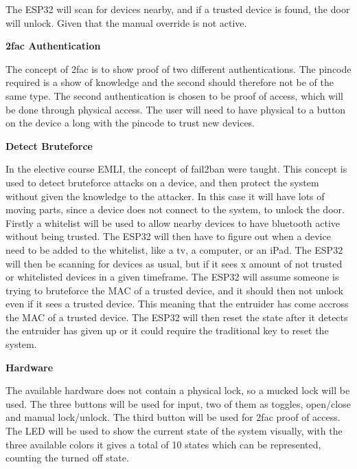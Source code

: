 The ESP32 will scan for devices nearby, and if a trusted device is found, the door will unlock.
Given that the manual override is not active.

\textbf{2fac Authentication}

The concept of 2fac is to show proof of two different authentications.
The pincode required is a show of knowledge and the second should therefore not be of the same type.
The second authentication is chosen to be proof of access, which will be done through physical access.
The user will need to have physical to a button on the device a long with the pincode to trust new devices.

\textbf{Detect Bruteforce}

In the elective course EMLI, the concept of fail2ban were taught.
This concept is used to detect bruteforce attacks on a device, and then protect the system without given the knowledge to the attacker.
In this case it will have lots of moving parts, since a device does not connect to the system, to unlock the door.
Firstly a whitelist will be used to allow nearby devices to have bluetooth active without being trusted.
The ESP32 will then have to figure out when a device need to be added to the whitelist, like a tv, a computer, or an iPad.
The ESP32 will then be scanning for devices as usual, but if it sees x amount of not trusted or whitelisted devices in a given timeframe.
The ESP32 will assume someone is trying to bruteforce the MAC of a trusted device, and it should then not unlock even if it sees a trusted device.
This meaning that the entruider has come accross the MAC of a trusted device.
The ESP32 will then reset the state after it detects the entruider has given up or it could require the traditional key to reset the system.

\textbf{Hardware}

The available hardware does not contain a physical lock, so a mucked lock will be used.
The three buttons will be used for input, two of them as toggles, open/close and manual lock/unlock.
The third button will be used for 2fac proof of access.
The LED will be used to show the current state of the system visually, with the three available colors it gives a total of 10 states which can be represented, counting the turned off state.